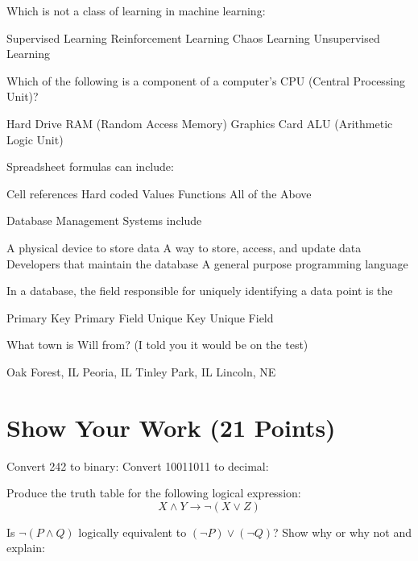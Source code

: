 \documentclass{exam}
\begin{document}
\begin{questions}
\question[1] Which is not a class of learning in machine learning:
\begin{choices}
    \choice Supervised Learning
    \choice Reinforcement Learning
    \choice Chaos Learning
    \choice Unsupervised Learning
\end{choices}
\question[1] Which of the following is a component of a computer's CPU (Central Processing Unit)?
\begin{choices}
    \choice Hard Drive
    \choice RAM (Random Access Memory)
    \choice Graphics Card
    \choice ALU (Arithmetic Logic Unit)
\end{choices}
\question[1] Spreadsheet formulas can include: 
\begin{choices}
    \choice Cell references
    \choice Hard coded Values
    \choice Functions
    \choice All of the Above
\end{choices}
\question[1] Database Management Systems include
\begin{choices}
    \choice A physical device to store data
    \choice A way to store, access, and update data
    \choice Developers that maintain the database
    \choice A general purpose programming language
\end{choices}
\question[1] In a database, the field responsible for uniquely identifying a data point is the 
\begin{choices}
    \choice Primary Key
    \choice Primary Field
    \choice Unique Key
    \choice Unique Field
\end{choices}

\bonusquestion[1] What town is Will from? (I told you it would be on the test) 
\begin{choices}
    \choice Oak Forest, IL
    \choice Peoria, IL
    \choice Tinley Park, IL
    \choice Lincoln, NE
\end{choices}

\newpage
\section{Show Your Work (21 Points)}
\question[3] Convert 242 to binary:
\vspace{4.5in}
\question[3] Convert 10011011 to decimal:
\newpage 

\question[5] Produce the truth table for the following logical expression:
\[
X \land Y \rightarrow \lnot(X \lor Z)
\]
\vspace{4in}

\question[5] Is $\lnot (P \land Q)$ logically equivalent to $(\lnot P) \lor (\lnot Q)$? Show why or why not and explain:


\end{questions}
\end{document}
